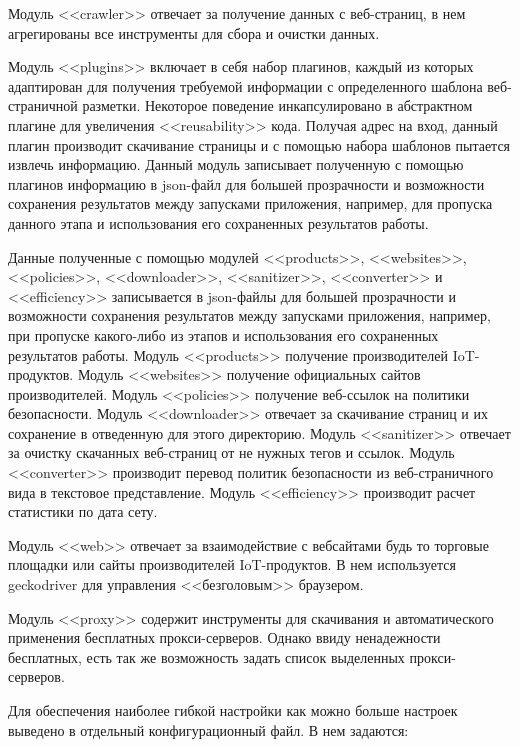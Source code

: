\documentclass[../main]{subfiles}
\begin{document}
Модуль <<crawler>> отвечает за получение данных с веб-страниц, в нем агрегированы все инструменты для сбора и очистки данных. 

Модуль <<plugins>> включает в себя набор плагинов, каждый из которых адаптирован для получения требуемой информации с определенного шаблона веб-страничной разметки. Некоторое поведение инкапсулировано в абстрактном плагине для увеличения <<reusability>> кода. Получая адрес на вход, данный плагин производит скачивание страницы и с помощью набора шаблонов пытается извлечь информацию. Данный модуль записывает полученную с помощью плагинов информацию в json-файл для большей прозрачности и возможности сохранения результатов между запусками приложения, например, для пропуска данного этапа и использования его сохраненных результатов работы. 

Данные полученные с помощью модулей <<products>>, <<websites>>, <<policies>>, <<downloader>>, <<sanitizer>>, <<converter>> и <<efficiency>> записывается в json-файлы для большей прозрачности и возможности сохранения результатов между запусками приложения, например, при пропуске какого-либо из этапов и использования его сохраненных результатов работы. Модуль <<products>> получение производителей IoT-продуктов. Модуль <<websites>> получение официальных сайтов производителей. Модуль <<policies>> получение веб-ссылок на политики безопасности. Модуль <<downloader>> отвечает за скачивание страниц и их сохранение в отведенную для этого директорию. Модуль <<sanitizer>> отвечает за очистку скачанных веб-страниц от не нужных тегов и ссылок. Модуль <<converter>> производит перевод политик безопасности из веб-страничного вида в текстовое представление. Модуль <<efficiency>> производит расчет статистики по дата сету.

Модуль <<web>> отвечает за взаимодействие с вебсайтами будь то торговые площадки или сайты производителей IoT-продуктов. В нем используется geckodriver для управления <<безголовым>> браузером. 

Модуль <<proxy>> содержит инструменты для скачивания и автоматического применения бесплатных прокси-серверов. Однако ввиду ненадежности бесплатных, есть так же возможность задать список выделенных прокси-серверов. 

Для обеспечения наиболее гибкой настройки как можно больше настроек выведено в отдельный конфигурационный файл. В нем задаются:
\end{document}
